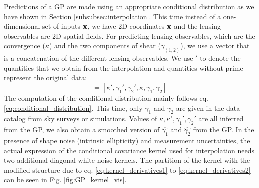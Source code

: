 Predictions of a GP are made using an appropriate conditional distribution as we have
shown in Section \ref{subsubsec:interpolation}. This time instead of a
one-dimensional set of inputs $\mathbf{x}$, we have 2D coordinates $\mathbf{x}$ and the
lensing observables are 2D spatial fields.
For predicting lensing observables, which are the convergence ($\kappa$) and
the two components of shear ($\gamma_{(1, 2)}$), we use a vector that is a concatenation of the
different lensing observables.  
We use $'$ to denote the quantities that we obtain
from the interpolation and quantities without prime represent the original data: 
\begin{equation}
[\lensparams', \lensparams]  = [\kappa', \gamma_1', \gamma_2', \kappa,
\gamma_1, \gamma_2] 
\end{equation}
The computation of the
conditional distribution mainly follows eq. \ref{eq:conditional_distribution}.
This time, only $\gamma_1$ and $\gamma_2$ are given in the data catalog from sky
surveys or simulations.  Values of
$\kappa, \kappa', \gamma_1', \gamma_2'$ are all inferred from the GP, we also
obtain a smoothed version of $\hat{\gamma_1}$ and $\hat{\gamma_2}$ from the GP.
In the presence of shape noise (intrinsic ellipticity) and measurement uncertainties, the actual 
expression of the conditional covariance kernel used for interpolation  
needs two additional diagonal white noise kernels.  
The partition of the kernel with the modified structure due to eq.
\ref{eq:kernel_derivatives1} to \ref{eq:kernel_derivatives2}
can be seen in Fig. \ref{fig:GP_kernel_vis}.

% 
